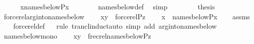 \begin{isabellebody}
\ \ \ \ \isamarkupfalse%
\ {\isachardoublequoteopen}x{\isasymin}names{\isacharunderscore}{\kern0pt}below{\isacharparenleft}{\kern0pt}P{\isacharcomma}{\kern0pt}x{\isacharparenright}{\kern0pt}{\isachardoublequoteclose}\isanewline
\ \ \ \ \ \ \isamarkupfalse%
\ names{\isacharunderscore}{\kern0pt}below{\isacharunderscore}{\kern0pt}def\ \isamarkupfalse%
\ simp\isanewline
\ \ \isacommand{{\isacharbraceright}{\kern0pt}}\isamarkupfalse%
\isanewline
\ \ \isamarkupfalse%
\ \isamarkupfalse%
\ {\isacharquery}{\kern0pt}thesis\ \isacommand{{\isachardot}{\kern0pt}}\isamarkupfalse%
\isanewline
{}\isamarkupfalse%
%
\endisatagproof
{\isafoldproof}%
%
\isadelimproof
\isanewline
%
\endisadelimproof
\isanewline
{}\isamarkupfalse%
\ forcerel{\isacharunderscore}{\kern0pt}arg{\isacharunderscore}{\kern0pt}into{\isacharunderscore}{\kern0pt}names{\isacharunderscore}{\kern0pt}below\ {\isacharcolon}{\kern0pt}\isanewline
\ \ \ {\isachardoublequoteopen}{\isasymlangle}x{\isacharcomma}{\kern0pt}y{\isasymrangle}\ {\isasymin}\ forcerel{\isacharparenleft}{\kern0pt}P{\isacharcomma}{\kern0pt}z{\isacharparenright}{\kern0pt}{\isachardoublequoteclose}\isanewline
\ \ \ \ {\isachardoublequoteopen}x\ {\isasymin}\ names{\isacharunderscore}{\kern0pt}below{\isacharparenleft}{\kern0pt}P{\isacharcomma}{\kern0pt}x{\isacharparenright}{\kern0pt}{\isachardoublequoteclose}\isanewline
%
\isadelimproof
\ \ %
\endisadelimproof
%
\isatagproof
{}\isamarkupfalse%
\ assms\isanewline
\ \ \isamarkupfalse%
\ forcerel{\isacharunderscore}{\kern0pt}def\isanewline
\ \ \isamarkupfalse%
{\isacharparenleft}{\kern0pt}rule\ trancl{\isacharunderscore}{\kern0pt}induct{\isacharsemicolon}{\kern0pt}auto\ simp\ add{\isacharcolon}{\kern0pt}\ arg{\isacharunderscore}{\kern0pt}into{\isacharunderscore}{\kern0pt}names{\isacharunderscore}{\kern0pt}below{\isacharparenright}{\kern0pt}%
\endisatagproof
{\isafoldproof}%
%
\isadelimproof
\isanewline
%
\endisadelimproof
\isanewline
{}\isamarkupfalse%
\ names{\isacharunderscore}{\kern0pt}below{\isacharunderscore}{\kern0pt}mono\ {\isacharcolon}{\kern0pt}\isanewline
\ \ \ {\isachardoublequoteopen}{\isasymlangle}x{\isacharcomma}{\kern0pt}y{\isasymrangle}\ {\isasymin}\ frecrel{\isacharparenleft}{\kern0pt}names{\isacharunderscore}{\kern0pt}below{\isacharparenleft}{\kern0pt}P{\isacharcomma}{\kern0pt}z{\isacharparenright}{\kern0pt}{\isacharparenright}{\kern0pt}{\isachardoublequoteclose}\isanewline

\end{isabellebody}
